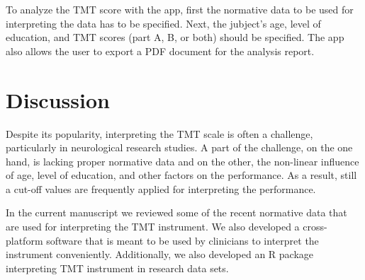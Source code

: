 \documentclass[]{article}
\begin{document}
\break

To analyze the TMT score with the app, first the normative data to be used for interpreting the data has to be specified. Next, the jubject's age, level of education, and TMT scores (part A, B, or both) should be specified. The app also allows the user to export a PDF document for the analysis report. 


\section{Discussion}

Despite its popularity, interpreting the TMT scale is often a challenge, particularly in neurological research studies. A part of the challenge, on the one hand, is lacking proper normative data and on the other, the non-linear influence of age, level of education, and other factors on the performance. As a result, still a cut-off values are frequently applied for interpreting the performance. 

In the current manuscript we reviewed some of the recent normative data that are used for interpreting the TMT instrument. We also developed a cross-platform software that is meant to be used by clinicians to interpret the instrument conveniently. Additionally, we also developed an R package interpreting TMT instrument in research data sets. 



\end{document}
